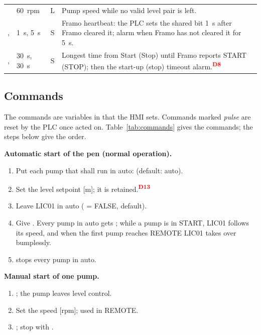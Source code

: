 \documentclass[11pt]{article}
\newcommand{\dev}[1]{\textsuperscript{\textcolor{red}{\textbf{D#1}}}}
\begin{document}
\begin{table}[htbp]
\begin{tabularx}{\textwidth}{@{}P{58mm}P{30mm}cL@{}}
 & 60~rpm & L &
  Pump speed while no valid level pair is left. \\
,  & 1~s, 5~s & S &
  Framo heartbeat: the PLC sets the shared bit 1~s after Framo cleared it; alarm when Framo has
  not cleared it for 5~s. \\
,  & 30~s, 30~s & S &
  Longest time from Start (Stop) until Framo reports START (STOP); then the start-up (stop) timeout
  alarm.\dev{8} \\
\bottomrule
\end{tabularx}
\end{table}

\subsection{Commands}
\label{sec:commands}

The commands are variables in  that the HMI sets. Commands marked \emph{pulse} are
reset by the PLC once acted on. Table~\ref{tab:commands} gives the commands; the steps below give
the order.

\textbf{Automatic start of the pen (normal operation).}
\begin{enumerate}
  \item Put each pump that shall run in auto:  (default: auto).
  \item Set the level setpoint  [m]; it is retained.\dev{13}
  \item Leave LIC01 in auto ( = FALSE, default).
  \item Give . Every pump in auto gets ; while a pump is in START,
        LIC01 follows its speed, and when the first pump reaches REMOTE LIC01 takes over
        bumplessly.
  \item {} stops every pump in auto.
\end{enumerate}

\textbf{Manual start of one pump.}
\begin{enumerate}
  \item {}; the pump leaves level control.
  \item Set the speed  [rpm]; used in REMOTE.
  \item {}; stop with .
\end{enumerate}
\end{document}
